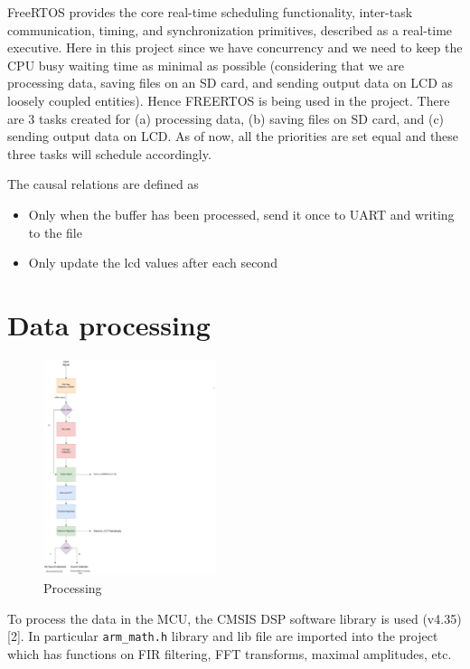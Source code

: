 \documentclass[11pt]{article}
\begin{document}
FreeRTOS provides the core real-time scheduling functionality, inter-task communication, timing, and synchronization primitives, described as a real-time executive. Here in this project since we have concurrency and we need to keep the CPU busy waiting time as minimal as possible (considering that we are processing data, saving files on an SD card, and sending output data on LCD as loosely coupled entities). Hence FREERTOS is being used in the project. There are 3 tasks created for (a) processing data, (b) saving files on SD card, and (c) sending output data on LCD. As of now, all the priorities are set equal and these three tasks will schedule accordingly.

The causal relations are defined as

\begin{itemize}
\item Only when the buffer has been processed, send it once to UART and writing to the file
\item Only update the lcd values after each second
\end{itemize}

\section{Data processing}
\label{sec:orgb3d89a2}

\begin{figure}[H]
    \centering
    \includegraphics[width=0.45\textwidth, trim={0cm 0cm 15cm 0cm}, clip]{Processing.pdf}
    \caption{Processing}
    \end{figure}

To process the data in the MCU, the CMSIS DSP software library is used (v4.35) [2]. In particular \texttt{arm\_math.h} library and lib file are imported into the project which has functions on FIR filtering, FFT transforms, maximal amplitudes, etc.
\end{document}
